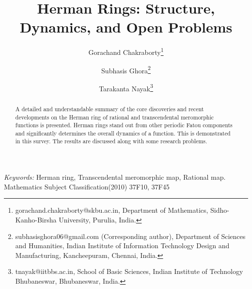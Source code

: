 \documentclass[12pt]{article}
\begin{document}
	
\title{Herman Rings: Structure, Dynamics, and Open Problems}
\author[]{Gorachand Chakraborty\footnote{gorachand.chakraborty@skbu.ac.in, Department of Mathematics, Sidho-Kanho-Birsha University, Purulia, India.} }
\author[]{Subhasis Ghora\footnote{subhasisghora06@gmail.com (Corresponding author), Department of Sciences and Humanities, Indian Institute of Information Technology Design and Manufacturing, Kancheepuram, Chennai, India. }}
\author[]{ Tarakanta Nayak\footnote{tnayak@iitbbs.ac.in, School of Basic Sciences, Indian Institute of Technology Bhubaneswar, Bhubaneswar, India. }}



\affil{}
\date{}
\maketitle	
	
\begin{abstract}
	
A detailed and understandable summary of the core discoveries and recent developments on the Herman ring of rational and transcendental meromorphic functions is presented.  Herman rings stand out from other periodic Fatou components and significantly determines the overall dynamics of a function. This is demonstrated in this survey. The results are discussed along with some research problems.
\end{abstract}

\textit{Keywords:}
 Herman ring, Transcendental meromorphic map, Rational map.\\
Mathematics Subject Classification(2010) 37F10,  37F45
\tableofcontents	
\end{document}
